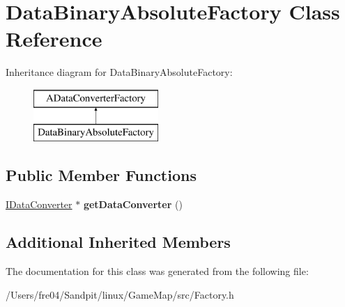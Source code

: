\hypertarget{class_data_binary_absolute_factory}{}\section{Data\+Binary\+Absolute\+Factory Class Reference}
\label{class_data_binary_absolute_factory}
Inheritance diagram for Data\+Binary\+Absolute\+Factory\+:\begin{figure}[H]
\begin{center}
\leavevmode
\includegraphics[height=2.000000cm]{class_data_binary_absolute_factory}
\end{center}
\end{figure}
\subsection*{Public Member Functions}
\begin{DoxyCompactItemize}
\item 
\hypertarget{class_data_binary_absolute_factory_adb39be6733ed757c161c01217ca76001}{}\hyperlink{class_i_data_converter}{I\+Data\+Converter} $\ast$ {\bfseries get\+Data\+Converter} ()\label{class_data_binary_absolute_factory_adb39be6733ed757c161c01217ca76001}

\end{DoxyCompactItemize}
\subsection*{Additional Inherited Members}


The documentation for this class was generated from the following file\+:\begin{DoxyCompactItemize}
\item 
/\+Users/fre04/\+Sandpit/linux/\+Game\+Map/src/Factory.\+h\end{DoxyCompactItemize}
